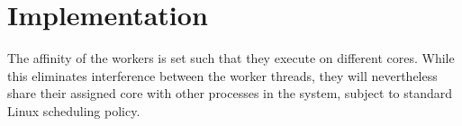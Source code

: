 
\chapter{Implementation}
\label{chap:locality-implementation}


The affinity of the workers is set such that they execute on different
cores. While this eliminates interference between the worker threads,
they will nevertheless share their assigned core with other processes
in the system, subject to standard Linux scheduling policy.

